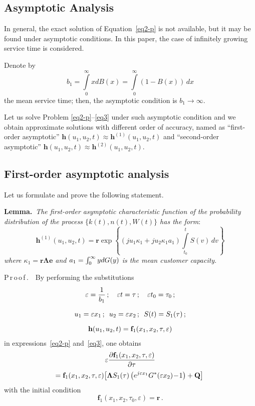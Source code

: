 \begin{multicols}{2}
\section{Asymptotic Analysis}

\noindent
In general, the exact solution of Equation~\eqref{eq2-p} is not available, 
but it may be found under asymptotic conditions. In this paper,  
the case of infinitely growing service time is considered.

Denote by
$$
b_1=\int\limits_0^\infty xdB(x)=\int\limits_0^\infty(1-B(x))\,dx
$$
the mean service time; then, the asymptotic condition is $b_1\to\infty$.

Let us solve Problem \eqref{eq2-p}--\eqref{eq3} under such asymptotic condition 
and we obtain  approximate solutions with different order of accuracy, named as 
``first-order asymptotic'' 
${\mathbf{h}}(u_1,u_2,t)\approx{\mathbf{h}}^{(1)}(u_1,u_2,t)$ and  
``second-order asymptotic'' 
${\mathbf{h}}(u_1,u_2,t)\approx{\mathbf{h}}^{(2)}(u_1,u_2,t)$.

\subsection{First-order asymptotic analysis}

\noindent
Let us formulate and prove the following statement.

\smallskip

\noindent
\textbf{Lemma.}\ 
\textit{The first-order asymptotic characteristic function of the probability 
distribution of the process $\{k(t),n(t),W(t)\}$  has the form}:
\begin{equation*}
\mathbf{h}^{(1)}(u_1,u_2,t)=\mathbf{r} 
\exp\left\{ \!\left(ju_1\kappa_1+ju_2\kappa_1a_1\right)
\!\int\limits_{t_0}^t \! S(v)\,dv\!\right\}
\end{equation*}
\textit{where  $\kappa_1=\mathbf{r\Lambda e}$ and  
$a_1=\int\limits\nolimits_0^\infty ydG(y)$ is the mean customer capacity}.

\smallskip


\noindent
P\,r\,o\,o\,f\,.\ \ 
By performing the substitutions
\begin{gather*}
\varepsilon=\displaystyle\frac{\displaystyle 1\mathstrut}{\displaystyle b_1\mathstrut}\,;\quad
 \varepsilon t=\tau\,;\quad 
 \varepsilon t_0=\tau_0\,;\\[6pt]
  u_1=\varepsilon x_1\,;\enskip
   u_2=\varepsilon x_2\,;\enskip 
   S(t)=S_1(\tau)\,;\\[6pt] 
   \mathbf{h}(u_1,u_2,t)=\mathbf{f}_1(x_1,x_2,\tau,\varepsilon)
\end{gather*}
in expressions~\eqref{eq2-p} and~\eqref{eq3}, one obtains
\begin{multline}
\varepsilon\fr{\partial \mathbf{f}_1(x_1,x_2,\tau,\varepsilon)}{\partial \tau}\\
\!\!\!\!\!{}=
\mathbf{f}_1(x_1,x_2,\tau,\varepsilon)\!\left[\mathbf{\Lambda} 
S_1(\tau)\left( e^{j\varepsilon x_1}G^*(\varepsilon x_2)\!-\!1\right) +\mathbf{Q}\right]\!\!
\label{eq6}
\end{multline}
with the initial condition
\begin{equation}
\label{eq7}
\mathbf{f}_1(x_1,x_2,\tau_0,\varepsilon)=\mathbf{r}\,.
\end{equation}


\end{multicols}

